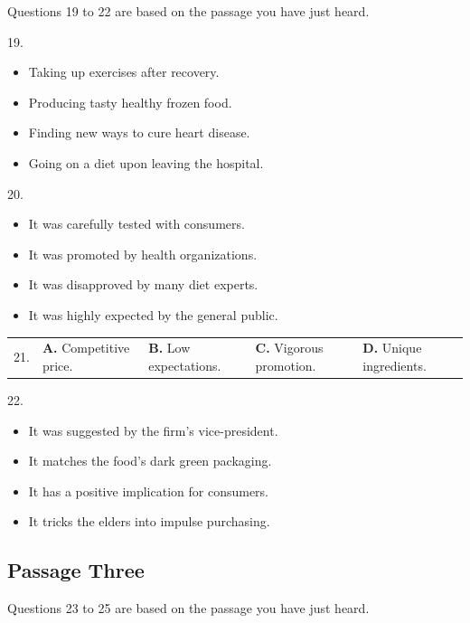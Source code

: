 \documentclass[UTF8,11pt]{ctexart}
\begin{document}
Questions 19 to 22 are based on the passage you have just heard.


19.


\begin{itemize}[leftmargin=2em,itemsep=.2em,topsep=.4em]\item[A.] Taking up exercises after recovery.
\item[B.] Producing tasty healthy frozen food.
\item[C.] Finding new ways to cure heart disease.
\item[D.] Going on a diet upon leaving the hospital.
\end{itemize}

20.


\begin{itemize}[leftmargin=2em,itemsep=.2em,topsep=.4em]\item[A.] It was carefully tested with consumers.
\item[B.] It was promoted by health organizations.
\item[C.] It was disapproved by many diet experts.
\item[D.] It was highly expected by the general public.
\end{itemize}

\noindent\begin{tabularx}{\linewidth}{@{}lXXXX@{}}21. & \textbf{A.} Competitive price. & \textbf{B.} Low expectations. & \textbf{C.} Vigorous promotion. & \textbf{D.} Unique ingredients.\\\end{tabularx}\par

22.


\begin{itemize}[leftmargin=2em,itemsep=.2em,topsep=.4em]\item[A.] It was suggested by the firm’s vice-president.
\item[B.] It matches the food’s dark green packaging.
\item[C.] It has a positive implication for consumers.
\item[D.] It tricks the elders into impulse purchasing.
\end{itemize}

\subsection*{\textbf{Passage Three}}


Questions 23 to 25 are based on the passage you have just heard.
\end{document}
